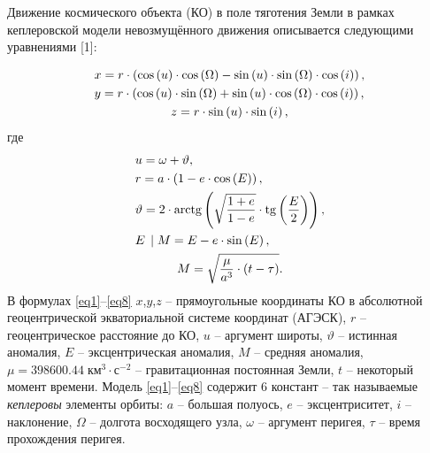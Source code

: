 
\vzmscaption


Движение космического объекта (КО) в поле тяготения Земли в рамках кеплеровской модели невозмущённого движения описывается следующими уравнениями [1]:

\vskip-7mm
\begin{gather}
\label{eq1}
  x = r \cdot \left( {\cos \left( u \right) \cdot \cos \left( \Omega  \right) - \sin \left( u \right) \cdot \sin \left( \Omega  \right) \cdot \cos \left( i \right)} \right), \hfill \\
\label{eq2}
  y = r \cdot \left( {\cos \left( u \right) \cdot \sin \left( \Omega  \right) + \sin \left( u \right) \cdot \cos \left( \Omega  \right) \cdot \cos \left( i \right)} \right), \hfill \\
\label{eq3}
  z = r \cdot \sin \left( u \right) \cdot \sin \left( i \right),
\end{gather}
\vskip-5mm
\noindent
где
\vskip-7mm
\begin{gather}
\label{eq4}
  u = \omega  + \vartheta , \hfill \\
\label{eq5}
  r = a \cdot \left( {1 - e \cdot \cos \left( E \right)} \right), \hfill \\
\label{eq6}
  \vartheta  = 2 \cdot \operatorname{arctg} \left( {\sqrt {\frac{{1 + e}}{{1 - e}}}  \cdot \operatorname{tg}\left( {\frac{E}{2}} \right)} \right),\hfill \\
\label{eq7}
  E\;\left| {\;M = E - e \cdot \sin \left( E \right),} \right. \hfill \\
\label{eq8}
  M = \sqrt {\frac{\mu }{{{a^3}}} \cdot \left( {t - \tau } \right)} .
\end{gather}
\vskip-3mm
В формулах \eqref{eq1}--\eqref{eq8}
$x$,$y$,$z$ -- прямоугольные координаты КО в абсолютной геоцентрической экваториальной системе координат (АГЭСК),
$r$ -- геоцентрическое расстояние до КО,
$u$ -- аргумент широты,
$\vartheta $ -- истинная аномалия,
$E$ -- эксцентрическая аномалия,
$M$ -- средняя аномалия,
$\mu  = 398600.44\;\text{км}^3 \cdot \text{с}^ {- 2}$ -- гравитационная постоянная Земли,
$t$ -- некоторый момент времени. Модель \eqref{eq1}--\eqref{eq8} содержит 6 констант -- так называемые \textit{кеплеровы} элементы орбиты:
$a$ -- большая полуось,
$e$ -- эксцентриситет,
$i$ -- наклонение,
$\Omega$ -- долгота восходящего узла,
$\omega$ -- аргумент перигея,
$\tau$ -- время прохождения перигея.

